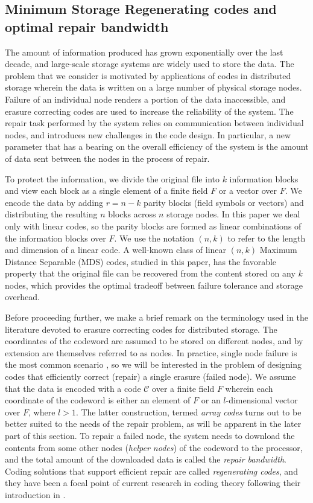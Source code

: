 \documentclass[11pt,onecolumn]{IEEEtran}
\newcommand{\cC}{\mathcal{C}}
\begin{document}
\subsection{Minimum Storage Regenerating codes and optimal repair bandwidth}
The amount of information produced has grown exponentially over the last decade, and large-scale storage systems are widely used to store the data. The problem that we consider is motivated by applications of
codes in distributed storage wherein the data is written on a large number of physical storage nodes. Failure of an individual node
renders a portion of the data inaccessible, and erasure correcting codes are used to increase the reliability of the system. 
The repair task performed by the system relies on communication between individual nodes, and introduces new challenges in the code
design. In particular, a new parameter that has a bearing on the overall efficiency of the system is the amount of data sent between the 
nodes in the process of repair. 

To protect the information, we divide the original file into $k$ information blocks and view each block as a single element of a finite field $F$ or a vector over $F$. We encode the data by adding $r=n-k$ parity blocks (field symbols or vectors) and distributing
the resulting $n$ blocks across $n$ storage nodes. In this paper we deal only with linear codes, so the parity blocks are
formed as linear combinations of the information blocks over $F.$ We use the notation $(n,k)$ to refer to the length and dimension of a
linear code. A well-known class of linear $(n,k)$ Maximum Distance Separable (MDS) codes, studied in this paper, has the favorable property that the original file can be recovered from the content stored on any $k$ nodes, which provides the optimal tradeoff between failure tolerance and storage overhead. 

Before proceeding further, we make a brief remark on the terminology used in the literature devoted to erasure correcting codes for
distributed storage. The coordinates of the codeword are assumed to be stored on different nodes, and by extension are themselves 
referred to as nodes. In practice, single node failure is the most common scenario \cite[Section 6.6]{Rashmi14}, so we will be
interested in the problem of designing codes that efficiently correct (repair) a single erasure (failed node). We assume that the data is encoded with a
code $\cC$ over a finite field $F$ wherein each coordinate of the codeword is either an element of $F$ or an $l$-dimensional vector
over $F$, where $l> 1.$ 
The latter construction, termed {\em array codes} turns out to be better suited to the needs of the repair problem,
as will be apparent in the later part of this section.  To repair a failed node, the system needs to download
the contents from some other nodes ({\em helper nodes}) of the codeword to the processor, and the total amount of the downloaded data is 
called the {\em repair bandwidth}. Coding solutions that support efficient repair are called {\em regenerating codes}, and they
have been a focal point of current research in coding theory following their introduction in \cite{Dimakis10}.
\end{document}
